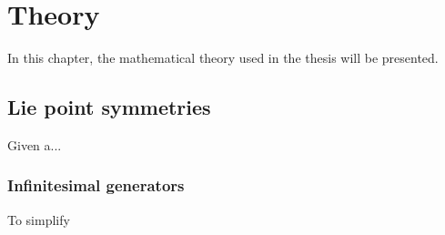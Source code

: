 \chapter{Theory}

In this chapter, the mathematical theory used in the thesis will be presented.

\section{Lie point symmetries}

Given a...

\subsection{Infinitesimal generators}

To simplify